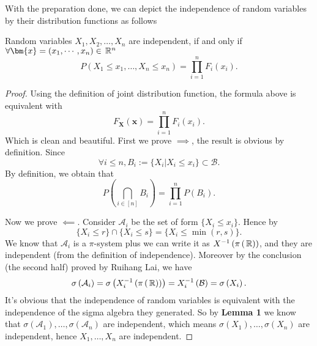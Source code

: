 With the preparation done, we can depict the independence of 
random variables by their distribution functions as follows
\begin{thm}
		Random variables $X_1,X_2,\ldots,X_{n}$ are independent, if and only if
		$\forall \bm{x}=\left( x_1,\ldots,x_{n} \right) \in \R^{n}$ 
		\[
			 P\left( X_1\le x_1,\ldots,X_{n}\le x_{n} \right) 
				= \prod_{i=1}^{n} F_{i}\left( x_{i} \right)  
		.\] 
\end{thm}
\begin{proof}
		Using the definition of joint distribution function, the 
		formula above is equivalent with 
	\[
			F_{\bm{X}}\left( \bm{x} \right) = \prod_{i=1}^{n} F_{i}\left( x_{i} \right)  
	.\] 
	Which is clean and beautiful. First we prove $\implies$, the result 
	is obvious by definition. Since 
	\[
	\forall i \le n, B_{i} :=\{X_i | X_i \le  x_i\} \subset \mathcal{B}
	.\] 
	By definition, we obtain that 
	\[
			P\left( \bigcap_{i\in [n] } B_{i}  \right) = 
			\prod_{i=1}^{n} P\left( B_{i} \right)  
	.\] 

	Now we prove $\impliedby$. Consider $\mathcal{A}_{i} $ be the set of form 
	$\{X_{i} \le  x_{i}\} $. Hence by
\[
		\{ X_{i} \le r \} \cap \{X_{i} \le  s\} = \{ X_{i} \le  \min\left( r,s \right) \} 
.\] 
	We know that $\mathcal{A}_{i}$ is a $\pi$-system plus we 
	can write it as $X^{-1}\left( \pi\left( \,\mathbb{R} \right)  \right) $, and they are 
	independent (from the definition of independence).
	Moreover by the conclusion (the second half) proved by Ruihang Lai,
we have
\[
		\sigma\left( \mathcal{A}_{i} \right)= \sigma\left(
		X_{i}^{-1}\left( \pi\left( \,\mathbb{R} \right)  \right)\right)  =X_{i}^{-1}\left( \mathcal{B} \right)  =  \sigma\left( X_{i} \right) 
.\]
	It's obvious that the independence of random variables 
	is equivalent with the independence of the sigma algebra they generated.
	So by \textbf{Lemma 1}  we know that $\sigma\left( \mathcal{A}_1 \right) , 
	\ldots, \sigma\left( \mathcal{A}_{n} \right) $ are independent, which 
	means $\sigma\left( X_1 \right) ,\ldots,\sigma\left( X_{n} \right) $ are
	independent,
	hence $X_1,\ldots,X_{n}$ are independent.
\end{proof}


